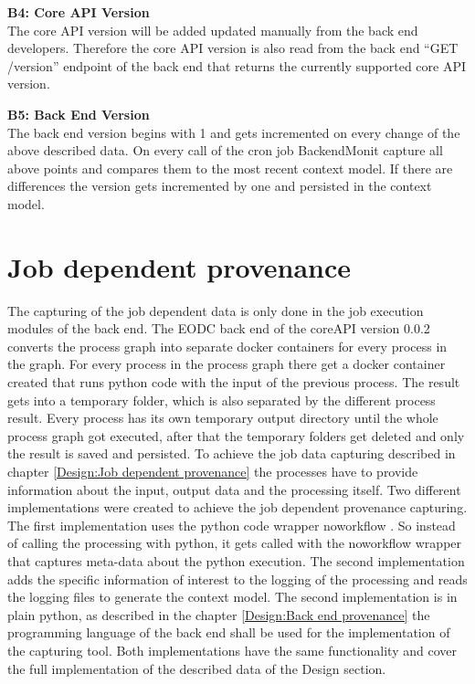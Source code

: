 \documentclass[draft,final]{vutinfth} %
\begin{document}
\textbf{B4: Core API Version} \\
The core API version will be added updated manually from the back end developers. Therefore the core API version is also read from the back end “GET /version” endpoint of the back end that returns the currently supported core API version. 

\textbf{B5: Back End Version} \\
The back end version begins with 1 and gets incremented on every change of the above described data. On every call of the cron job BackendMonit capture all above points and compares them to the most recent context model. If there are differences the version gets incremented by one and persisted in the context model. 


\section{Job dependent provenance}\label{Implementation:Job dependent provenance}
The capturing of the job dependent data is only done in the job execution modules of the back end. The EODC back end of the coreAPI version 0.0.2 converts the process graph into separate docker containers for every process in the graph. For every process in the process graph there get a docker container created that runs python code with the input of the previous process. The result gets into a temporary folder, which is also separated by the different process result. Every process has its own temporary output directory until the whole process graph got executed, after that the temporary folders get deleted and only the result is saved and persisted.
To achieve the job data capturing described in chapter \ref{Design:Job dependent provenance} the processes have to provide information about the input, output data and the processing itself. Two different implementations were created to achieve the job dependent provenance capturing. The first implementation uses the python code wrapper noworkflow \cite{c9e0604becba42af96a9cb0a6f60018b}. So instead of calling the processing with python, it gets called with the noworkflow wrapper that captures meta-data about the python execution. The second implementation adds the specific information of interest to the logging of the processing and reads the logging files to generate the context model. The second implementation is in plain python, as described in the chapter \ref{Design:Back end provenance} the programming language of the back end shall be used for the implementation of the capturing tool. Both implementations have the same functionality and cover the full implementation of the described data of the Design section. 
\end{document}
